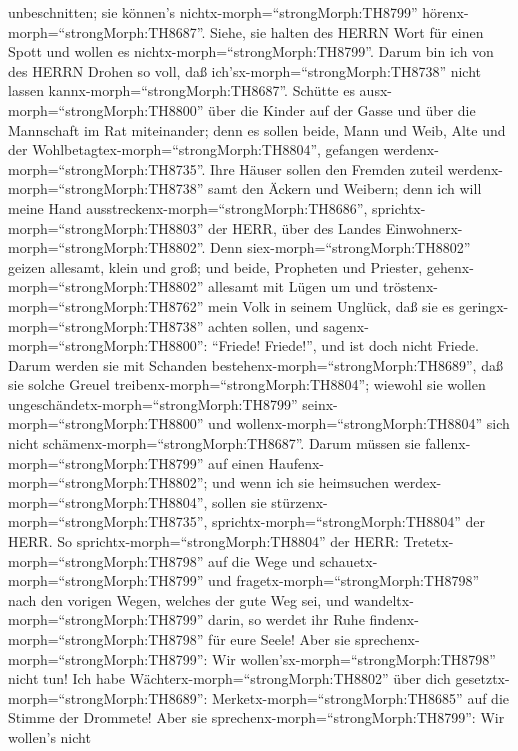 unbeschnitten; sie können's nichtx-morph=``strongMorph:TH8799''
hörenx-morph=``strongMorph:TH8687''. Siehe, sie halten des HERRN Wort
für einen Spott und wollen es nichtx-morph=``strongMorph:TH8799''.
 Darum bin ich von des HERRN Drohen so voll, daß
ich'sx-morph=``strongMorph:TH8738'' nicht lassen
kannx-morph=``strongMorph:TH8687''. Schütte es
ausx-morph=``strongMorph:TH8800'' über die Kinder auf der Gasse und über
die Mannschaft im Rat miteinander; denn es sollen beide, Mann und Weib,
Alte und der Wohlbetagtex-morph=``strongMorph:TH8804'', gefangen
werdenx-morph=``strongMorph:TH8735''.  Ihre Häuser sollen
den Fremden zuteil werdenx-morph=``strongMorph:TH8738'' samt den Äckern
und Weibern; denn ich will meine Hand
ausstreckenx-morph=``strongMorph:TH8686'',
sprichtx-morph=``strongMorph:TH8803'' der HERR, über des Landes
Einwohnerx-morph=``strongMorph:TH8802''.  Denn
siex-morph=``strongMorph:TH8802'' geizen allesamt, klein und groß; und
beide, Propheten und Priester, gehenx-morph=``strongMorph:TH8802''
allesamt mit Lügen um  und
tröstenx-morph=``strongMorph:TH8762'' mein Volk in seinem Unglück, daß
sie es geringx-morph=``strongMorph:TH8738'' achten sollen, und
sagenx-morph=``strongMorph:TH8800'': ``Friede! Friede!'', und ist doch
nicht Friede.  Darum werden sie mit Schanden
bestehenx-morph=``strongMorph:TH8689'', daß sie solche Greuel
treibenx-morph=``strongMorph:TH8804''; wiewohl sie wollen
ungeschändetx-morph=``strongMorph:TH8799''
seinx-morph=``strongMorph:TH8800'' und
wollenx-morph=``strongMorph:TH8804'' sich nicht
schämenx-morph=``strongMorph:TH8687''. Darum müssen sie
fallenx-morph=``strongMorph:TH8799'' auf einen
Haufenx-morph=``strongMorph:TH8802''; und wenn ich sie heimsuchen
werdex-morph=``strongMorph:TH8804'', sollen sie
stürzenx-morph=``strongMorph:TH8735'',
sprichtx-morph=``strongMorph:TH8804'' der HERR.  So
sprichtx-morph=``strongMorph:TH8804'' der HERR:
Tretetx-morph=``strongMorph:TH8798'' auf die Wege und
schauetx-morph=``strongMorph:TH8799'' und
fragetx-morph=``strongMorph:TH8798'' nach den vorigen Wegen, welches der
gute Weg sei, und wandeltx-morph=``strongMorph:TH8799'' darin, so werdet
ihr Ruhe findenx-morph=``strongMorph:TH8798'' für eure Seele! Aber sie
sprechenx-morph=``strongMorph:TH8799'': Wir
wollen'sx-morph=``strongMorph:TH8798'' nicht tun!  Ich habe
Wächterx-morph=``strongMorph:TH8802'' über dich
gesetztx-morph=``strongMorph:TH8689'':
Merketx-morph=``strongMorph:TH8685'' auf die Stimme der Drommete! Aber
sie sprechenx-morph=``strongMorph:TH8799'': Wir wollen's nicht
